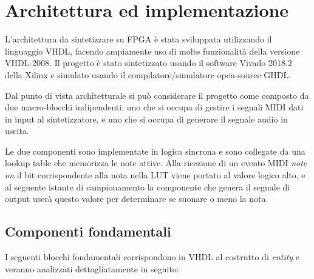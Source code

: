 \newcommand{\code}[1]{\texttt{#1}} 

\newcommand{\blockdiagram}[4]{
	\begin{tikzpicture}[font=\sffamily,>=triangle 45]
         \node [circuit] (item) {};
		
		\matrix[
		matrix of nodes,
		left= of item,
		row sep=\myheight/15,
		nodes={anchor=east}
		] (rightmatr) {
			#3
			\\
		};
		\matrix[
		matrix of nodes,
		right= of item,
		row sep=\myheight/15,
		nodes={anchor=west}
		] (leftmatr) {
			#4
			\\
		};
	
		\foreach \i in {1,...,#1}
			\draw [->] (rightmatr-\i-1) -- (rightmatr-\i-1 -| item.west);
		\foreach \i in {1,...,#2}
			\draw [<-] (leftmatr-\i-1) -- (leftmatr-\i-1 -| item.east);
	\end{tikzpicture}
}


\chapter{Architettura ed implementazione}

L'architettura da sintetizzare su FPGA è stata sviluppata utilizzando il linguaggio VHDL, facendo
ampiamente uso di molte funzionalità della versione VHDL-2008.
Il progetto è stato sintetizzato usando il software Vivado 2018.2 della Xilinx e simulato usando il compilatore/simulatore open-source GHDL.

Dal punto di vista architetturale si può considerare il progetto come composto da due macro-blocchi indipendenti: uno che si occupa di gestire i segnali MIDI dati in input al sintetizzatore, e uno che si occupa di generare il segnale audio in uscita.

Le due componenti sono implementate in logica sincrona e sono collegate da una lookup table che memorizza le note attive. Alla ricezione di un evento MIDI \textit{note on} il bit corrispondente alla nota nella LUT viene portato al valore logico alto, e al seguente istante di campionamento la componente che genera il segnale di output userà questo valore per determinare se suonare o meno la nota.

\section{Componenti fondamentali}
I seguenti blocchi fondamentali corrispondono in VHDL al costrutto di \textit{entity} e veranno analizzati dettagliatamente in seguito:

